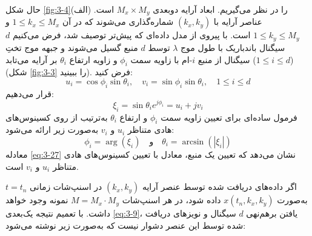 حال شکل \ref{fig:3-4}(الف) را در نظر می‌گیریم. ابعاد آرایه دوبعدی $M_x \times M_y$ است. عناصر آرایه با $(k_x, k_y)$ شماره‌گذاری می‌شوند که در آن $1 \leq k_x \leq M_x$ و $1 \leq k_y \leq M_y$ است. با پیروی از مدل داده‌ای که پیش‌تر توصیف شد، فرض می‌کنیم $d$ سیگنال باندباریک با طول موج $\lambda$ توسط $d$ منبع گسیل می‌شوند و جبهه موج تختِ سیگنال از منبع $i$-ام با زاویه سمت $\phi_i$ و زاویه ارتفاع $\theta_i$ بر آرایه می‌تابد ($1 \leq i \leq d$) (شکل \ref{fig:3-3} را ببینید). فرض کنید:
\begin{equation}
	u_i = \cos \phi_i \sin \theta_i, \quad v_i = \sin \phi_i \sin \theta_i, \quad 1 \leq i \leq d
	\label{eq:3-25}
\end{equation}
قرار می‌دهیم:
\begin{equation}
	\xi_i = \sin \theta_i e^{j \phi_i} = u_i + jv_i
	\label{eq:3-26}
\end{equation}
فرمول ساده‌ای برای تعیین زاویه سمت $\phi_i$ و ارتفاع $\theta_i$ به‌ترتیب از روی کسینوس‌های هادی متناظر $u_i$ و $v_i$ به‌صورت زیر ارائه می‌شود:
\begin{equation}
	\phi_i = \arg(\xi_i) \quad \text{و} \quad \theta_i = \arcsin(|\xi_i|)
	\label{eq:3-27}
\end{equation}
معادله \eqref{eq:3-27} نشان می‌دهد که تعیین  یک منبع، معادل با تعیین کسینوس‌های هادی متناظر $u_i$ و $v_i$ است.

اگر داده‌های دریافت شده توسط عنصر آرایه $(k_x, k_y)$ در اسنپ‌شات زمانی $t = t_n$ به‌صورت $x(t_n, k_x, k_y)$ داده شود، در هر اسنپ‌شات $M = M_x \cdot M_y$ نمونه وجود خواهد داشت. با تعمیم نتیجه یک‌بعدی \eqref{eq:3-9}، یافتن برهم‌نهی $d$ سیگنال و نویزهای دریافت شده توسط این عنصر دشوار نیست که به‌صورت زیر نوشته می‌شود:











